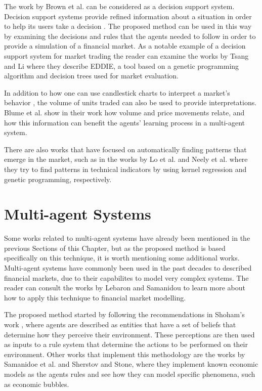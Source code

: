 The work by Brown et al. can be considered as a decision support
system. Decision support systems provide refined information about a situation
in order to help its users take a decision \cite{Keen1980}. The proposed method
can be used in this way by examining the decisions and rules that the agents
needed to follow in order to provide a simulation of a financial market. As a
notable example of a decision support system for market trading the reader can
examine the works by Tsang and Li \cite{Tsang2004} \cite{tsang1998eddie} where
they describe EDDIE, a tool based on a genetic programming algorithm and
decision trees used for market evaluation.

In addition to how one can use candlestick charts to interpret a market's
behavior \cite{Nison1991}, the volume of units traded can also be used to
provide interpretations. Blume et al. \cite{Blume1994} show in their work how
volume and price movements relate, and how this information can benefit the
agents' learning process in a multi-agent system.

There are also works that have focused on automatically finding patterns that
emerge in the market, such as in the works by Lo et al. \cite{Lo2000} and Neely
et al. \cite{Neely1997} where they try to find patterns in technical indicators
by using kernel regression and genetic programming, respectively.

\section{Multi-agent Systems}
\label{section:multi-agent-systems}

Some works related to multi-agent systems have already been mentioned in the
previous Sections of this Chapter, but as the proposed method is based
specifically on this technique, it is worth mentioning some additional
works. Multi-agent systems have commonly been used in the past decades to
described financial markets, due to their capabilites to model very complex
systems. The reader can consult the works by Lebaron \cite{Lebaron2001} and
Samanidou \cite{Bundesbank2007} to learn more about how to apply this technique
to financial market modelling.

The proposed method started by following the recommendations in Shoham's work
\cite{Shoham1993} \cite{Shoham2009}, where agents are described as entities that
have a set of beliefs that determine how they perceive their environment. These
perceptions are then used as inputs to a rule system that determine the actions
to be performed on their environment. Other works that implement this
methodology are the works by Samanidoe et al. \cite{Bundesbank2007} and Sherstov
and Stone\cite{Sherstov2005}, where they implement known economic models as the
agents rules and see how they can model specific phenomena, such as economic
bubbles.

